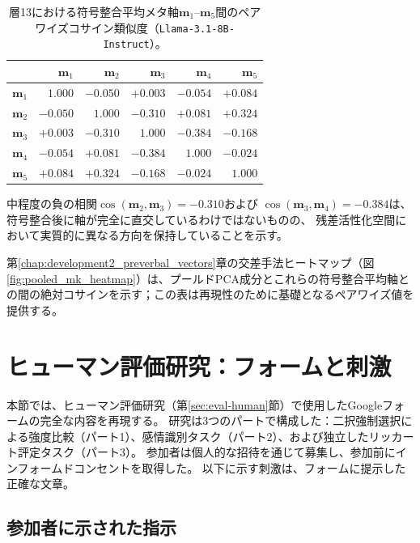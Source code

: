 \begin{table}[htbp]
\centering
\begin{tabular}{lrrrrr}
\hline
& $\mathbf{m}_1$ & $\mathbf{m}_2$ & $\mathbf{m}_3$ & $\mathbf{m}_4$ & $\mathbf{m}_5$ \\
\hline
$\mathbf{m}_1$ & $1.000$  & $-0.050$ & $+0.003$ & $-0.054$ & $+0.084$ \\
$\mathbf{m}_2$ & $-0.050$ & $1.000$  & $-0.310$ & $+0.081$ & $+0.324$ \\
$\mathbf{m}_3$ & $+0.003$ & $-0.310$ & $1.000$  & $-0.384$ & $-0.168$ \\
$\mathbf{m}_4$ & $-0.054$ & $+0.081$ & $-0.384$ & $1.000$  & $-0.024$ \\
$\mathbf{m}_5$ & $+0.084$ & $+0.324$ & $-0.168$ & $-0.024$ & $1.000$  \\
\hline
\end{tabular}
\caption{層13における符号整合平均メタ軸$\mathbf{m}_1$--$\mathbf{m}_5$間のペアワイズコサイン類似度（\texttt{Llama-3.1-8B-Instruct}）。}
\label{tab:cosine_matrix}
\end{table}

中程度の負の相関$\cos(\mathbf{m}_2,\mathbf{m}_3) = -0.310$および
$\cos(\mathbf{m}_3,\mathbf{m}_4) = -0.384$は、符号整合後に軸が完全に直交しているわけではないものの、
残差活性化空間において実質的に異なる方向を保持していることを示す。\par

第\ref{chap:development2_preverbal_vectors}章の交差手法ヒートマップ（図\ref{fig:pooled_mk_heatmap}）は、プールドPCA成分とこれらの符号整合平均軸との間の絶対コサインを示す；この表は再現性のために基礎となるペアワイズ値を提供する。

\section{ヒューマン評価研究：フォームと刺激}
\label{app:human_eval}

本節では、ヒューマン評価研究（第\ref{sec:eval-human}節）で使用したGoogleフォームの完全な内容を再現する。
研究は3つのパートで構成した：二択強制選択による強度比較（パート1）、感情識別タスク（パート2）、および独立したリッカート評定タスク（パート3）。
参加者は個人的な招待を通じて募集し、参加前にインフォームドコンセントを取得した。
以下に示す刺激は、フォームに提示した正確な文章。

\subsection*{参加者に示された指示}

